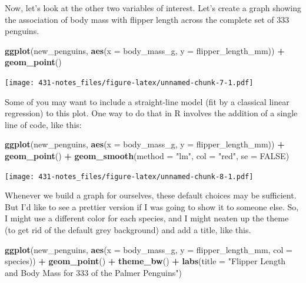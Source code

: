 \documentclass[
]{book}
\newenvironment{Shaded}{\begin{snugshade}}{\end{snugshade}}
\newcommand{\DataTypeTok}[1]{\textcolor[rgb]{0.13,0.29,0.53}{#1}}
\newcommand{\KeywordTok}[1]{\textcolor[rgb]{0.13,0.29,0.53}{\textbf{#1}}}
\newcommand{\NormalTok}[1]{#1}
\newcommand{\OperatorTok}[1]{\textcolor[rgb]{0.81,0.36,0.00}{\textbf{#1}}}
\newcommand{\OtherTok}[1]{\textcolor[rgb]{0.56,0.35,0.01}{#1}}
\newcommand{\StringTok}[1]{\textcolor[rgb]{0.31,0.60,0.02}{#1}}
\begin{document}
Now, let's look at the other two variables of interest. Let's create a graph showing the association of body mass with flipper length across the complete set of 333 penguins.

\begin{Shaded}
\begin{Highlighting}[]
\KeywordTok{ggplot}\NormalTok{(new_penguins, }\KeywordTok{aes}\NormalTok{(}\DataTypeTok{x =}\NormalTok{ body_mass_g, }\DataTypeTok{y =}\NormalTok{ flipper_length_mm)) }\OperatorTok{+}
\StringTok{    }\KeywordTok{geom_point}\NormalTok{() }
\end{Highlighting}
\end{Shaded}

\texttt{[image: 431-notes\_files/figure-latex/unnamed-chunk-7-1.pdf]}

Some of you may want to include a straight-line model (fit by a classical linear regression) to this plot. One way to do that in R involves the addition of a single line of code, like this:

\begin{Shaded}
\begin{Highlighting}[]
\KeywordTok{ggplot}\NormalTok{(new_penguins, }\KeywordTok{aes}\NormalTok{(}\DataTypeTok{x =}\NormalTok{ body_mass_g, }\DataTypeTok{y =}\NormalTok{ flipper_length_mm)) }\OperatorTok{+}
\StringTok{    }\KeywordTok{geom_point}\NormalTok{() }\OperatorTok{+}
\StringTok{    }\KeywordTok{geom_smooth}\NormalTok{(}\DataTypeTok{method =} \StringTok{"lm"}\NormalTok{, }\DataTypeTok{col =} \StringTok{"red"}\NormalTok{, }\DataTypeTok{se =} \OtherTok{FALSE}\NormalTok{)}
\end{Highlighting}
\end{Shaded}

\texttt{[image: 431-notes\_files/figure-latex/unnamed-chunk-8-1.pdf]}

Whenever we build a graph for ourselves, these default choices may be sufficient. But I'd like to see a prettier version if I was going to show it to someone else. So, I might use a different color for each species, and I might neaten up the theme (to get rid of the default grey background) and add a title, like this.

\begin{Shaded}
\begin{Highlighting}[]
\KeywordTok{ggplot}\NormalTok{(new_penguins, }\KeywordTok{aes}\NormalTok{(}\DataTypeTok{x =}\NormalTok{ body_mass_g, }\DataTypeTok{y =}\NormalTok{ flipper_length_mm, }\DataTypeTok{col =}\NormalTok{ species)) }\OperatorTok{+}
\StringTok{    }\KeywordTok{geom_point}\NormalTok{() }\OperatorTok{+}\StringTok{ }
\StringTok{    }\KeywordTok{theme_bw}\NormalTok{() }\OperatorTok{+}\StringTok{ }
\StringTok{    }\KeywordTok{labs}\NormalTok{(}\DataTypeTok{title =} \StringTok{"Flipper Length and Body Mass for 333 of the Palmer Penguins"}\NormalTok{)}
\end{Highlighting}
\end{Shaded}
\end{document}
